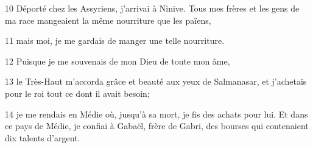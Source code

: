
10 Déporté chez les Assyriens, j’arrivai à Ninive. Tous mes frères et les gens de ma race mangeaient la même nourriture que les païens,

11 mais moi, je me gardais de manger une telle nourriture.

12 Puisque je me souvenais de mon Dieu de toute mon âme,

13 le Très-Haut m’accorda grâce et beauté aux yeux de Salmanasar, et j’achetais pour le roi tout ce dont il avait besoin;

14 je me rendais en Médie où, jusqu’à sa mort, je fis des achats pour lui. Et dans ce pays de Médie, je confiai à Gabaël, frère de Gabri, des bourses qui contenaient dix talents d’argent.